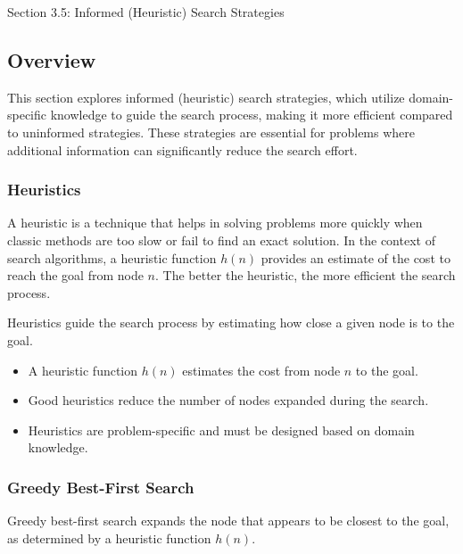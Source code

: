 \begin{notes}{Section 3.5: Informed (Heuristic) Search Strategies}
    \subsection*{Overview}

    This section explores informed (heuristic) search strategies, which utilize domain-specific knowledge to guide the search process, making it more efficient compared to uninformed strategies. These 
    strategies are essential for problems where additional information can significantly reduce the search effort.
    
    \subsubsection*{Heuristics}
    
    A heuristic is a technique that helps in solving problems more quickly when classic methods are too slow or fail to find an exact solution. In the context of search algorithms, a heuristic function 
    $h(n)$ provides an estimate of the cost to reach the goal from node $n$. The better the heuristic, the more efficient the search process.
    
    \begin{highlight}
    
    Heuristics guide the search process by estimating how close a given node is to the goal.
    
    \begin{itemize}
        \item A heuristic function $h(n)$ estimates the cost from node $n$ to the goal.
        \item Good heuristics reduce the number of nodes expanded during the search.
        \item Heuristics are problem-specific and must be designed based on domain knowledge.
    \end{itemize}
    
    \end{highlight}
    
    \subsubsection*{Greedy Best-First Search}
    
    Greedy best-first search expands the node that appears to be closest to the goal, as determined by a heuristic function $h(n)$.
    

\end{notes}

